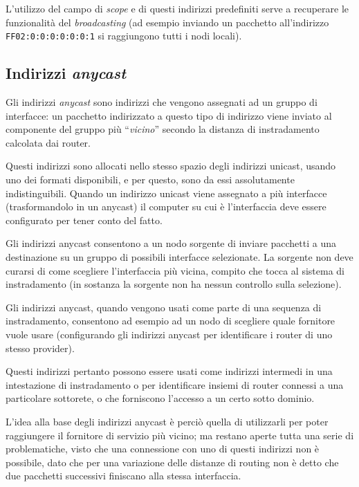 L'utilizzo del campo di \textit{scope} e di questi indirizzi predefiniti serve
a recuperare le funzionalità del \textit{broadcasting} (ad esempio inviando un
pacchetto all'indirizzo \texttt{FF02:0:0:0:0:0:0:1} si raggiungono tutti i
nodi locali).


\subsection{Indirizzi \textit{anycast}}
\label{sec:IP_anycast}

Gli indirizzi \textit{anycast} sono indirizzi che vengono assegnati ad un
gruppo di interfacce: un pacchetto indirizzato a questo tipo di indirizzo
viene inviato al componente del gruppo più ``\textsl{vicino}'' secondo la
distanza di instradamento calcolata dai router.

Questi indirizzi sono allocati nello stesso spazio degli indirizzi unicast,
usando uno dei formati disponibili, e per questo, sono da essi assolutamente
indistinguibili. Quando un indirizzo unicast viene assegnato a più interfacce
(trasformandolo in un anycast) il computer su cui è l'interfaccia deve essere
configurato per tener conto del fatto.

Gli indirizzi anycast consentono a un nodo sorgente di inviare pacchetti a una
destinazione su un gruppo di possibili interfacce selezionate. La sorgente non
deve curarsi di come scegliere l'interfaccia più vicina, compito che tocca al
sistema di instradamento (in sostanza la sorgente non ha nessun controllo
sulla selezione).

Gli indirizzi anycast, quando vengono usati come parte di una sequenza di
instradamento, consentono ad esempio ad un nodo di scegliere quale fornitore
vuole usare (configurando gli indirizzi anycast per identificare i router di
uno stesso provider).

Questi indirizzi pertanto possono essere usati come indirizzi intermedi in una
intestazione di instradamento o per identificare insiemi di router connessi a
una particolare sottorete, o che forniscono l'accesso a un certo sotto
dominio.

L'idea alla base degli indirizzi anycast è perciò quella di utilizzarli per
poter raggiungere il fornitore di servizio più vicino; ma restano aperte tutta
una serie di problematiche, visto che una connessione con uno di questi
indirizzi non è possibile, dato che per una variazione delle distanze di
routing non è detto che due pacchetti successivi finiscano alla stessa
interfaccia.


